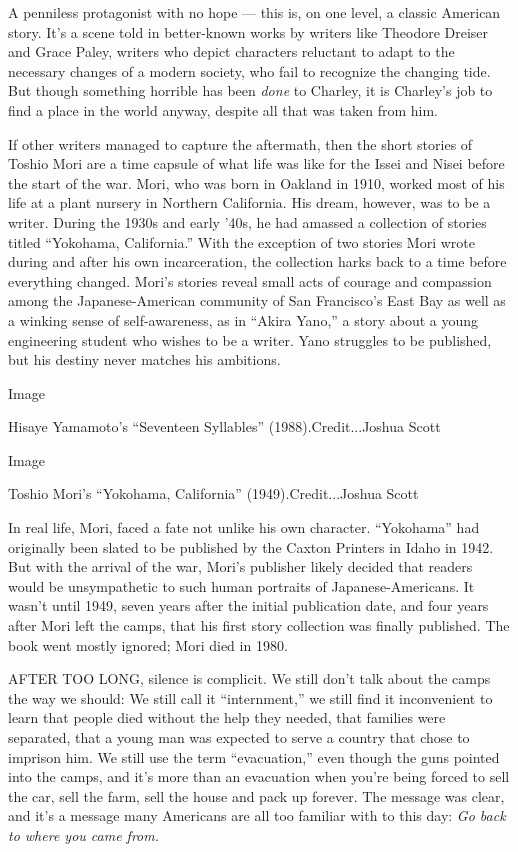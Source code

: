 A penniless protagonist with no hope --- this is, on one level, a
classic American story. It's a scene told in better-known works by
writers like Theodore Dreiser and Grace Paley, writers who depict
characters reluctant to adapt to the necessary changes of a modern
society, who fail to recognize the changing tide. But though something
horrible has been \emph{done} to Charley, it is Charley's job to find a
place in the world anyway, despite all that was taken from him.

If other writers managed to capture the aftermath, then the short
stories of Toshio Mori are a time capsule of what life was like for the
Issei and Nisei before the start of the war. Mori, who was born in
Oakland in 1910, worked most of his life at a plant nursery in Northern
California. His dream, however, was to be a writer. During the 1930s and
early '40s, he had amassed a collection of stories titled ``Yokohama,
California.'' With the exception of two stories Mori wrote during and
after his own incarceration, the collection harks back to a time before
everything changed. Mori's stories reveal small acts of courage and
compassion among the Japanese-American community of San Francisco's East
Bay as well as a winking sense of self-awareness, as in ``Akira Yano,''
a story about a young engineering student who wishes to be a writer.
Yano struggles to be published, but his destiny never matches his
ambitions.

Image

Hisaye Yamamoto's ``Seventeen Syllables'' (1988).Credit...Joshua Scott

Image

Toshio Mori's ``Yokohama, California'' (1949).Credit...Joshua Scott

In real life, Mori, faced a fate not unlike his own character.
``Yokohama'' had originally been slated to be published by the Caxton
Printers in Idaho in 1942. But with the arrival of the war, Mori's
publisher likely decided that readers would be unsympathetic to such
human portraits of Japanese-Americans. It wasn't until 1949, seven years
after the initial publication date, and four years after Mori left the
camps, that his first story collection was finally published. The book
went mostly ignored; Mori died in 1980.

AFTER TOO LONG, silence is complicit. We still don't talk about the
camps the way we should: We still call it ``internment,'' we still find
it inconvenient to learn that people died without the help they needed,
that families were separated, that a young man was expected to serve a
country that chose to imprison him. We still use the term
``evacuation,'' even though the guns pointed into the camps, and it's
more than an evacuation when you're being forced to sell the car, sell
the farm, sell the house and pack up forever. The message was clear, and
it's a message many Americans are all too familiar with to this day:
\emph{Go back to where you came from.}

